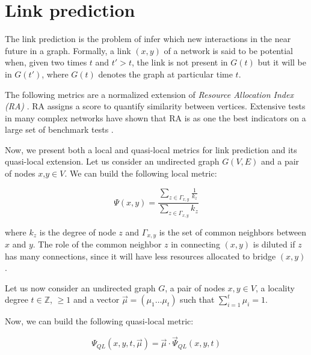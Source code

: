 \section{Link prediction}
\label{sec:link-prediction}

The link prediction is the problem of infer which new interactions in the near future in a graph. Formally, a link $(x,y)$ of a network is said to be potential when, given two times $t$ and $t'>t$, the link is not present in $G(t)$ but it will be in $G(t')$, where $G(t)$ denotes the graph at particular time $t$. 

The following metrics are a normalized extension of \textit{Resource Allocation Index (RA)} \cite{berlusconi2016link, Lu2011,zhou2009predicting}. RA assigns a score to quantify similarity between vertices. Extensive tests in many complex networks have shown that RA is as one the best indicators on a large set of benchmark tests  \cite{berlusconi2016link,Lu2011}.

Now, we present both a local and quasi-local metrics for link prediction and its quasi-local extension.
Let us consider an undirected graph $G(V,E)$ and a pair of nodes $x$,$y\in V$. We can build the following local metric:

\begin{equation}
\label{eqn:prediction-local}
\Psi(x,y)=
\frac{\sum\limits_{z\in\Gamma_{x,y}}\frac{1}{k_{z}}}
{\sum\limits_{z\in\Gamma_{x,y}}k_{z}}
\end{equation}

where $k_{z}$ is the degree of node $z$ and $\Gamma_{x,y}$ is the set of common neighbors between $x$ and $y$. The role of the common neighbor $z$ in connecting $(x, y)$ is diluted if $z$ has many connections, since it will have less resources allocated to bridge $(x, y)$ \cite{berlusconi2016link}.

Let us now consider an undirected graph $G$, a pair of nodes $x,y\in V$, a locality degree $t\in \mathbb{Z}$, $\geq 1$ and a vector $\vec{\mu}=(\mu_{1}\ldots\mu_{t})$ such that $\sum_{i=1}^{t}\mu_{i}=1$. 

Now, we can build the following quasi-local metric:

\begin{equation}
\label{eqn:prediction-quasi-local-1}
\Psi_{QL}(x,y,t,\vec{\mu})=\vec{\mu}\cdot\vec{\Psi}_{QL}(x,y,t)
\end{equation}

